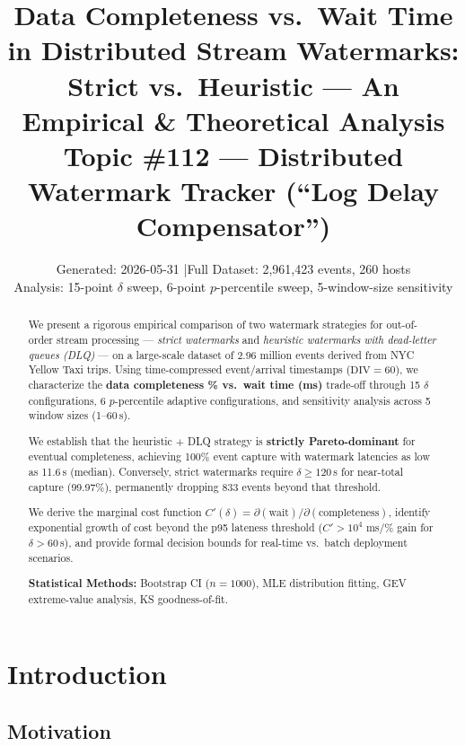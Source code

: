\documentclass[11pt,a4paper]{article}
\title{\textbf{Data Completeness vs.\ Wait Time in Distributed Stream Watermarks:\\
Strict vs.\ Heuristic --- An Empirical \& Theoretical Analysis}\\[4pt]
\large Topic \#112 --- Distributed Watermark Tracker (``Log Delay Compensator'')}
\author{}
\date{Generated: 2026-05-31 \quad|\quad Full Dataset: 2,961,423 events, 260 hosts\\
Analysis: 15-point $\delta$ sweep, 6-point $p$-percentile sweep, 5-window-size sensitivity}
\begin{document}
\maketitle
\thispagestyle{fancy}

\begin{abstract}
\noindent
We present a rigorous empirical comparison of two watermark strategies for out-of-order stream processing --- \textit{strict watermarks} and \textit{heuristic watermarks with dead-letter queues (DLQ)} --- on a large-scale dataset of 2.96 million events derived from NYC Yellow Taxi trips.
Using time-compressed event/arrival timestamps ($\text{DIV}=60$), we characterize the \textbf{data completeness \% vs.\ wait time (ms)} trade-off through 15 $\delta$ configurations, 6 $p$-percentile adaptive configurations, and sensitivity analysis across 5 window sizes (1--60\,s).

We establish that the heuristic $+$ DLQ strategy is \textbf{strictly Pareto-dominant} for eventual completeness, achieving 100\% event capture with watermark latencies as low as 11.6\,s (median). Conversely, strict watermarks require $\delta \geq 120$\,s for near-total capture (99.97\%), permanently dropping 833 events beyond that threshold.

We derive the marginal cost function $C'(\delta) = \partial(\text{wait})/\partial(\text{completeness})$, identify exponential growth of cost beyond the p95 lateness threshold ($C' > 10^4$ ms/\% gain for $\delta > 60$\,s), and provide formal decision bounds for real-time vs.\ batch deployment scenarios.

\vspace{4pt}
\noindent\textbf{Statistical Methods:} Bootstrap CI ($n{=}1000$), MLE distribution fitting, GEV extreme-value analysis, KS goodness-of-fit.
\end{abstract}

\section{Introduction}

\subsection{Motivation}
\end{document}
